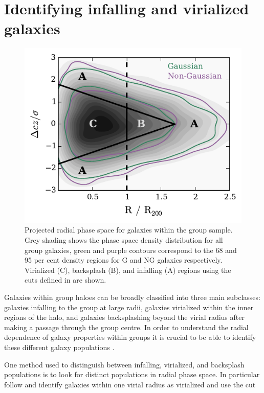 \documentclass[a4paper,fleqn,usenatbib]{mnras}
\begin{document}

\section{Identifying infalling and virialized galaxies}
\label{sec:rad_div}

\begin{figure}
  \centering
  \includegraphics[width=\columnwidth]{vnorm_r_con.pdf}
  \caption{Projected radial phase space
    for galaxies within the group sample.  Grey shading shows the phase
    space density distribution for all group galaxies, green and
    purple contours correspond to the 68 and 95 per cent density
    regions for G and NG galaxies respectively. Virialized (C),
    backsplash (B), and infalling (A) regions using the cuts defined in
    \citet{mahajan2011} are shown.}
  \label{fig:vnorm_r}
\end{figure}

Galaxies within group haloes can be broadly classified into three main
subclasses: galaxies infalling to the group at large radii, galaxies
virialized within the inner regions of the halo, and galaxies
backsplashing beyond the virial radius after making a passage through
the group centre.  In order to understand the radial dependence of
galaxy properties within groups it is crucial to be able to
identify these different galaxy populations
\citep{gill2005, mahajan2011, pimbblet2011, haines2015, noble2016}.
\par
One method used to distinguish between infalling, virialized, and
backsplash populations is to look for distinct populations in radial
phase space.  In particular \citet{mahajan2011} follow
\citet{sanchis2004} and identify galaxies within one virial radius as
virialized and use the cut
\end{document}
